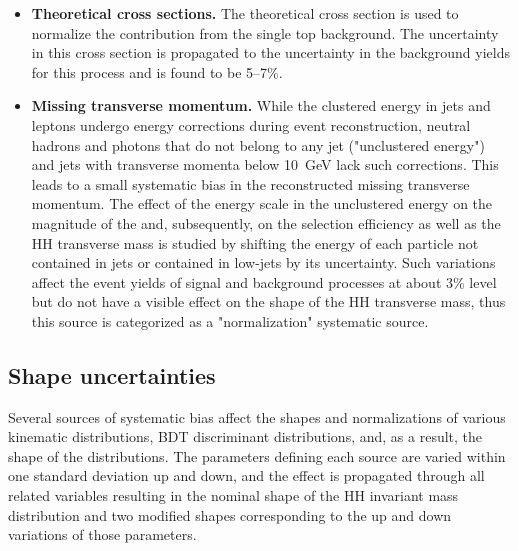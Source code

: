 \begin{itemize}
\item{\bf Theoretical cross sections.} 
The theoretical cross section is
  used to normalize the contribution from the single top
  background. The uncertainty in this cross section is propagated to
  the uncertainty in the background yields for this process and is
  found to be 5--7\%. 

\item{\bf Missing transverse momentum.} 
While the clustered energy in
  jets and leptons undergo energy corrections during event
  reconstruction, neutral hadrons and photons that do not belong to any jet
  ("unclustered energy") and jets with transverse momenta below
  10~GeV lack such corrections. This leads to a small systematic
  bias in the reconstructed missing transverse momentum. The effect of the
  energy scale in the unclustered energy on the magnitude of the
  \ptvecmiss and, subsequently, on the selection efficiency as well as
  the HH transverse mass is studied by shifting the energy of each
  particle not contained in jets or contained in low-\pt jets by its
  uncertainty. Such variations
  affect the event yields of signal and background processes at about
  3\% level but do not have a visible effect on the shape of the HH
  transverse mass, thus this source is categorized as a
  "normalization" systematic source.

\end{itemize}

\subsection{Shape uncertainties}

Several sources of systematic bias affect the shapes and normalizations of various
kinematic distributions, BDT discriminant distributions, and, as a
result, the shape of the \mTHH distributions. The parameters defining
each source are varied within one standard deviation up and down, and
the effect is propagated through all related variables resulting in
the nominal shape of the HH invariant mass distribution and two
modified shapes corresponding to the up and down variations of those
parameters.  %

